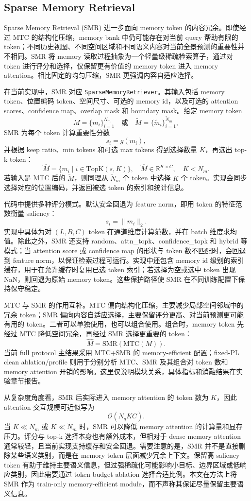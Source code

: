 \subsection{Sparse Memory Retrieval}
Sparse Memory Retrieval (SMR) 进一步面向 memory token 的内容冗余。即使经过 MTC 的结构化压缩，memory bank 中仍可能存在对当前 query 帮助有限的 token；不同历史视图、不同空间区域和不同语义内容对当前全景预测的重要性并不相同。SMR 将 memory 读取过程抽象为一个轻量级稀疏检索算子，通过对 token 进行评分和选择，仅保留更有价值的 memory token 进入 memory attention。相比固定的均匀压缩，SMR 更强调内容自适应选择。

在当前实现中，SMR 对应 \texttt{SparseMemoryRetriever}。其输入包括 memory token、位置编码 token、空间尺寸、可选的 memory id，以及可选的 attention scores、confidence map、overlap mask 和 boundary mask。给定 memory token
\[
M = \{m_i\}_{i=1}^{N_m}\quad \text{或}\quad \tilde{M}=\{\tilde{m}_i\}_{i=1}^{\tilde{N}_m},
\]
SMR 为每个 token 计算重要性分数
\[
s_i = g(m_i),
\]
并根据 keep ratio、min tokens 和可选 max tokens 得到选择数量 $K$，再选出 top-k token：
\[
\hat{M} = \{m_i \mid i \in \mathrm{TopK}(s,K)\}, \quad \hat{M} \in \mathbb{R}^{K \times C}, \quad K < N_m.
\]
若输入是 MTC 后的 $\tilde{M}$，则同理从 $\tilde{N}_m$ 个 token 中选择 $K$ 个 token。实现会同步选择对应的位置编码，并返回被选 token 的索引和统计信息。

代码中提供多种评分模式。默认安全回退为 feature norm，即用 token 的特征范数衡量 saliency：
\[
s_i = \lVert m_i \rVert_2.
\]
实现中具体为对 $(L,B,C)$ token 在通道维度计算范数，并在 batch 维度求均值。除此之外，SMR 还支持 random、attn\_topk、confidence\_topk 和 hybrid 等模式；当 attention score 或 confidence map 的形状与 token 数不匹配时，会回退到 feature norm，以保证检索过程可运行。实现中还包含 memory id 级别的索引缓存，用于在允许缓存时复用已选 token 索引；若选择为空或选中 token 出现 NaN，则回退为原始 memory token。这些保护路径使 SMR 在不同训练配置下保持保守稳定。

MTC 与 SMR 的作用互补。MTC 偏向结构化压缩，主要减少局部空间邻域中的冗余 token；SMR 偏向内容自适应选择，主要保留评分更高、对当前预测更可能有用的 token。二者可以单独使用，也可以组合使用。组合时，memory token 先经过 MTC 降低空间冗余，再经过 SMR 选择更重要的 token：
\[
\hat{M} = \mathrm{SMR}(\mathrm{MTC}(M)).
\]
当前 full protocol 主结果采用 MTC+SMR 的 memory-efficient 配置；fixed-PL clean ablation/profile 则用于分别分析 MTC、SMR 及其组合对 token 数和 memory attention 开销的影响。这里仅说明模块关系，具体指标和消融结果在实验章节报告。

从复杂度角度看，SMR 后实际进入 memory attention 的 token 数为 $K$，因此 attention 交互规模可近似写为
\[
\mathcal{O}(N_q K C).
\]
当 $K \ll N_m$ 或 $K \ll \tilde{N}_m$ 时，SMR 可以降低 memory attention 的计算量和显存压力。评分与 top-k 选择本身也有额外成本，但相对于 dense memory attention 通常较轻，且当前实现支持缓存和安全回退。需要注意的是，SMR 并不是直接删除某些语义类别，而是在 memory token 层面减少冗余上下文。保留高 saliency token 有助于维持主要语义信息，但过强稀疏化可能影响小目标、边界区域或低响应类别，因此需要通过 token budget ablation 选择合适比例。本文在方法上将 SMR 作为 train-only memory-efficient module，而不声称其保证尽量保留主要语义信息。


